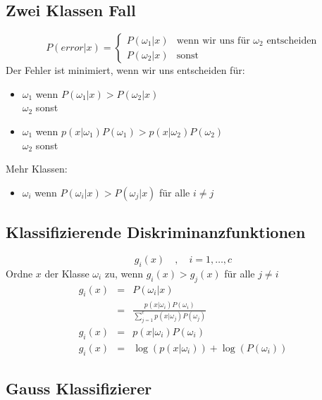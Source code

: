 \subsection{Zwei Klassen Fall}

$$P(error | x) = \left\{ \begin{array}{cl} P(\omega_1 | x) & \textrm{wenn wir uns für } \omega_2 \textrm{ entscheiden} \\ P(\omega_2 | x) & \textrm{sonst} \end{array} \right.$$
Der Fehler ist minimiert, wenn wir uns entscheiden für:
\begin{itemize}
\item $\omega_1$ wenn $P(\omega_1 | x) > P(\omega_2 | x)$ \\ $\omega_2$ sonst
\item $\omega_1$ wenn $p(x | \omega_1)P(\omega_1) > p(x | \omega_2)P(\omega_2)$ \\ $\omega_2$ sonst
\end{itemize}
Mehr Klassen:
\begin{itemize}
\item $\omega_i$ wenn $P(\omega_i | x) > P(\omega_j | x)$ für alle $i \not= j$
\end{itemize}

\subsection{Klassifizierende Diskriminanzfunktionen}

$$g_i(x) \quad , \quad i = 1, \dots, c$$
Ordne $x$ der Klasse $\omega_i$ zu, wenn $g_i(x) > g_j(x)$ für alle $j \not= i$
\begin{eqnarray*}
g_i(x) &=& P(\omega_i | x) \\ &=& \frac{p(x | \omega_i) P(\omega_i)}{\sum\limits_{j=1}^c p(x | \omega_j)P(\omega_j)} \\ g_i(x) &=& p(x | \omega_i) P(\omega_i) \\
g_i(x) &=& \log(p(x | \omega_i)) + \log(P(\omega_i))
\end{eqnarray*}

\subsection{Gauss Klassifizierer}

